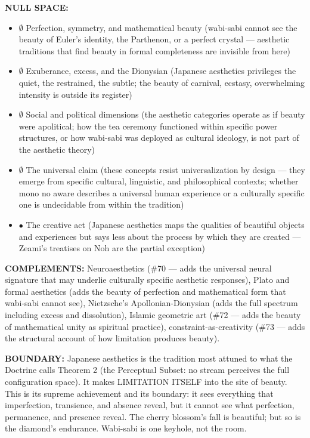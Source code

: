 \textbf{NULL SPACE:}

\begin{itemize}[nosep,leftmargin=*]
  \item $\emptyset$ Perfection, symmetry, and mathematical beauty (wabi-sabi cannot see the beauty of Euler's identity, the Parthenon, or a perfect crystal — aesthetic traditions that find beauty in formal completeness are invisible from here)
  \item $\emptyset$ Exuberance, excess, and the Dionysian (Japanese aesthetics privileges the quiet, the restrained, the subtle; the beauty of carnival, ecstasy, overwhelming intensity is outside its register)
  \item $\emptyset$ Social and political dimensions (the aesthetic categories operate as if beauty were apolitical; how the tea ceremony functioned within specific power structures, or how wabi-sabi was deployed as cultural ideology, is not part of the aesthetic theory)
  \item $\emptyset$ The universal claim (these concepts resist universalization by design — they emerge from specific cultural, linguistic, and philosophical contexts; whether mono no aware describes a universal human experience or a culturally specific one is undecidable from within the tradition)
  \item $\bullet$ The creative act (Japanese aesthetics maps the qualities of beautiful objects and experiences but says less about the process by which they are created — Zeami's treatises on Noh are the partial exception)
\end{itemize}


\textbf{COMPLEMENTS:} Neuroaesthetics (\#70 — adds the universal neural signature that may underlie culturally specific aesthetic responses), Plato and formal aesthetics (adds the beauty of perfection and mathematical form that wabi-sabi cannot see), Nietzsche's Apollonian-Dionysian (adds the full spectrum including excess and dissolution), Islamic geometric art (\#72 — adds the beauty of mathematical unity as spiritual practice), constraint-as-creativity (\#73 — adds the structural account of how limitation produces beauty).


\textbf{BOUNDARY:} Japanese aesthetics is the tradition most attuned to what the Doctrine calls Theorem 2 (the Perceptual Subset: no stream perceives the full configuration space). It makes LIMITATION ITSELF into the site of beauty. This is its supreme achievement and its boundary: it sees everything that imperfection, transience, and absence reveal, but it cannot see what perfection, permanence, and presence reveal. The cherry blossom's fall is beautiful; but so is the diamond's endurance. Wabi-sabi is one keyhole, not the room.


